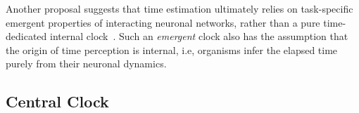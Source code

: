\par
Another proposal suggests that time estimation ultimately relies on task-specific emergent properties of interacting neuronal networks, rather than a pure time-dedicated internal clock~\cite{Paton2018NeuronRev}.
Such an \emph{emergent} clock also has the assumption that the origin of time perception is internal, i.e, organisms infer the elapsed time purely from their neuronal dynamics.

\subsection{Central Clock}
\label{ch:intro:InternalTimeEstimation:Central}


